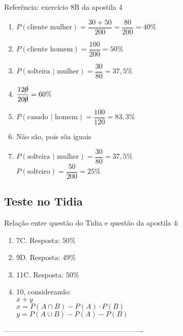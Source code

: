 \documentclass[a4paper]{article}
\begin{document}
	Referência: exercício 8B da apostila 4
	
	\begin{enumerate}[label=\alph*.]
		\item $P(\text{cliente mulher}) = \dfrac{30 + 50}{200} = \dfrac{80}{200} = 40\%$
		\item $P(\text{cliente homem}) = \dfrac{100}{200} = 50\%$
		\item $P(\text{solteira }|\text{ mulher}) = \dfrac{30}{80} = 37,5\%$
		\item $\dfrac{12\cancel{0}}{20\cancel{0}} = 60\%$
		\item $P(\text{casado }|\text{ homem}) = \dfrac{100}{120} = 83,3\%$
		\item Não são, pois sõa iguais
		\item $P(\text{solteira }|\text{ mulher}) = \dfrac{30}{80} = 37,5\%$ \\
			$P(\text{solteiro}) = \dfrac{50}{200} = 25\%$\\
	\end{enumerate}

	\subsection{Teste no Tidia}
	
	Relação entre questão do Tidia e questão da apostila 4:
	
	\begin{enumerate}
		\item 7C. Resposta: $50\%$
		\item 9D. Resposta: $49\%$
		\item 11C. Resposta: $50\%$
		\item 10, considerando: \\
			$x+y$ \\
			$x = P(A \cap B) - P(A) \cdot P(B)$ \\
			$y = P(A \cup B) - P(A) - P(B)$
	\end{enumerate}	

	 ----------------------------------------------------------
	
	
	
		
	
\end{document}
